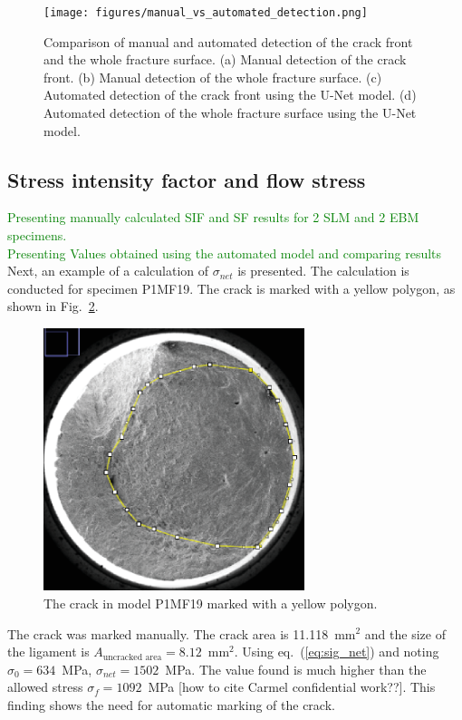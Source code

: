 \documentclass[preprint,12pt]{elsarticle}
\begin{document}
\begin{figure}[ht!]
\centering
\texttt{[image: figures/manual\_vs\_automated\_detection.png]}
\caption{Comparison of manual and automated detection of the crack front and the whole fracture surface. (a) Manual detection of the crack front. (b) Manual detection of the whole fracture surface. (c) Automated detection of the crack front using the U-Net model. (d) Automated detection of the whole fracture surface using the U-Net model.}
\label{fig:manual_vs_automated_detection}
\end{figure}

\subsection{Stress intensity factor and flow stress}
\label{Subsec: Stress intensity factor and flow stress}
\textcolor{green}{Presenting manually calculated SIF and SF results for 2 SLM and 2 EBM specimens.\\Presenting Values obtained using the automated model and comparing results }
Next, an example of a calculation of $\sigma_{net}$ is presented.
The calculation is conducted for specimen P1MF19.
The crack is marked with a yellow polygon, as shown in Fig.~\ref{fig:P1MF19}.
%
\begin{figure}[ht!]
  \begin{center}
  \includegraphics[width=3in]{P1MF19.eps}
  \caption{The crack in model P1MF19 marked with a yellow polygon.}
  \label{fig:P1MF19}
   \end{center}
\end{figure}
%
The crack was marked manually.
The crack area is 11.118~mm$^2$ and the size of the ligament is $A_{\mbox{uncracked area}}=8.12$~mm$^2$.
Using eq.~(\ref{eq:sig_net}) and noting $\sigma_0=634$~MPa,
                           $\sigma_{net}=1502$~MPa.
The value found is much higher than the allowed stress $\sigma_f=1092$~MPa [how to cite Carmel confidential work??].
This finding shows the need for automatic marking of the crack.
\end{document}
